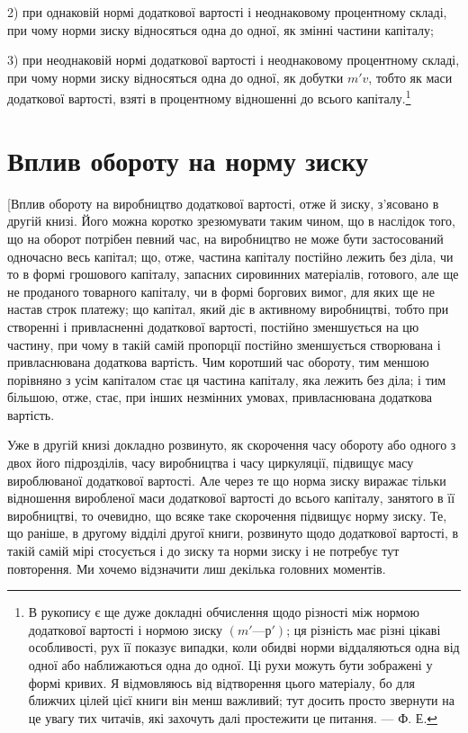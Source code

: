 \parcont{}  %
2) при однаковій нормі додаткової вартості і неоднаковому
процентному складі, при чому норми зиску відносяться одна до
одної, як змінні частини капіталу;

3) при неоднаковій нормі додаткової вартості і неоднаковому
процентному складі, при чому норми зиску відносяться одна до
одної, як добутки $m'v$, тобто як маси додаткової вартості,
взяті в процентному відношенні до всього капіталу.\footnote{
В рукопису є ще дуже докладні обчислення щодо різності між нормою
додаткової вартості і нормою зиску $(m' — р')$; ця різність має різні цікаві особливості,
рух її показує випадки, коли обидві норми віддаляються одна від
одної або наближаються одна до одної. Ці рухи можуть бути зображені у формі
кривих. Я відмовляюсь від відтворення цього матеріалу, бо для ближчих цілей
цієї книги він менш важливий; тут досить просто звернути на це увагу тих
читачів, які захочуть далі простежити це питання. — Ф. Е.
}

\section{Вплив обороту на норму зиску}

[Вплив обороту на виробництво додаткової вартості, отже
й зиску, з’ясовано в другій книзі. Його можна коротко зрезюмувати
таким чином, що в наслідок того, що на оборот потрібен
певний час, на виробництво не може бути застосований одночасно
весь капітал; що, отже, частина капіталу постійно лежить без
діла, чи то в формі грошового капіталу, запасних сировинних
матеріалів, готового, але ще не проданого товарного капіталу,
чи в формі боргових вимог, для яких ще не настав строк платежу;
що капітал, який діє в активному виробництві, тобто при
створенні і привласненні додаткової вартості, постійно зменшується
на цю частину, при чому в такій самій пропорції постійно
зменшується створювана і привласнювана додаткова вартість.
Чим коротший час обороту, тим меншою порівняно з усім
капіталом стає ця частина капіталу, яка лежить без діла; і тим
більшою, отже, стає, при інших незмінних умовах, привласнювана
додаткова вартість.

Уже в другій книзі докладно розвинуто, як скорочення часу
обороту або одного з двох його підрозділів, часу виробництва
і часу циркуляції, підвищує масу вироблюваної додаткової вартості.
Але через те що норма зиску виражає тільки відношення
виробленої маси додаткової вартості до всього капіталу, занятого
в її виробництві, то очевидно, що всяке таке скорочення підвищує
норму зиску. Те, що раніше, в другому відділі другої
книги, розвинуто щодо додаткової вартості, в такій самій мірі
стосується і до зиску та норми зиску і не потребує тут повторення.
Ми хочемо відзначити лиш декілька головних моментів.

